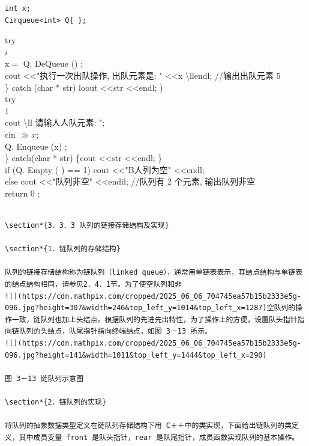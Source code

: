 \documentclass[10pt]{article}
\begin{document}
\begin{verbatim}
int x;
Cirqueue<int> Q{ };
\end{verbatim}

try\\
$i$\\
$\mathrm{x}=$ Q. DeQueue () ;\\
cout <<"执行一次出队操作, 出队元素是: " <<x \textbackslash llendl; //输出出队元素 5\\
\} catch (char * str) loout <<str <<endl; )\\
try\\
1\\
cout \textbackslash ll 请输人人队元素: ";\\
cin $\gg x$;\\
Q. Enqueue (x) ;\\
\} catch(char * str) \{cout <<str <<endl; \}\\
if (Q. Empty ( ) == 1) cout <<"B人列为空" <<endl;\\
else cout <<"队列非空" <<endil; //队列有 2 个元素, 输出队列非空\\
return 0 ;

\begin{verbatim}

\section*{3．3．3 队列的链接存储结构及实现}

\section*{1．链队列的存储结构}

队列的链接存储结构称为链队列（linked queue），通常用单链表表示，其结点结构与单链表的结点结构相同，请参见2．4．1节。为了使空队列和非
![](https://cdn.mathpix.com/cropped/2025_06_06_704745ea57b15b2333e5g-096.jpg?height=307&width=246&top_left_y=1014&top_left_x=1287)空队列的操作一致，链队列也加上头结点。根据队列的先进先出特性，为了操作上的方便，设置队头指针指向链队列的头结点，队尾指针指向终端结点，如图 3－13 所示。
![](https://cdn.mathpix.com/cropped/2025_06_06_704745ea57b15b2333e5g-096.jpg?height=141&width=1011&top_left_y=1444&top_left_x=290)

图 3－13 链队列示意图

\section*{2．链队列的实现}

将队列的抽象数据类型定义在链队列存储结构下用 C＋＋中的类实现，下面给出链队列的类定义，其中成员变量 front 是队头指针，rear 是队尾指针，成员函数实现队列的基本操作。
\end{verbatim}
\end{document}
